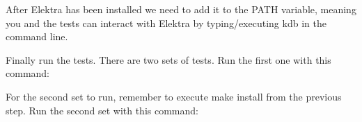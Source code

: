 \begin{DoxyCode}{0}
\end{DoxyCode}


After Elektra has been installed we need to add it to the P\+A\+TH variable, meaning you and the tests can interact with Elektra by typing/executing {\ttfamily kdb} in the command line.


\begin{DoxyCode}{0}
\end{DoxyCode}


Finally run the tests. There are two sets of tests. Run the first one with this command\+:


\begin{DoxyCode}{0}
\end{DoxyCode}


For the second set to run, remember to execute {\ttfamily make install} from the previous step. Run the second set with this command\+:


\begin{DoxyCode}{0}
\end{DoxyCode}
 